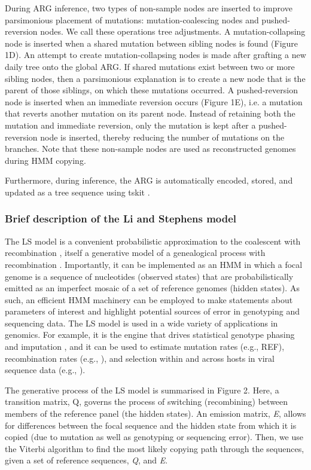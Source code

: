 \documentclass{article}
\begin{document}
During ARG inference, two types of non-sample nodes are inserted to improve
parsimonious placement of mutations: mutation-coalescing nodes and
pushed-reversion nodes. We call these operations tree adjustments. A
mutation-collapsing node is inserted when a shared mutation between sibling
nodes is found (Figure 1D). An attempt to create mutation-collapsing nodes is
made after grafting a new daily tree onto the global ARG. If shared mutations
exist between two or more sibling nodes, then a parsimonious explanation is to
create a new node that is the parent of those siblings, on which these
mutations occurred. A pushed-reversion node is inserted when an immediate
reversion occurs (Figure 1E), i.e. a mutation that reverts another mutation on
its parent node. Instead of retaining both the mutation and immediate
reversion, only the mutation is kept after a pushed-reversion node is inserted,
thereby reducing the number of mutations on the branches. Note that these
non-sample nodes are used as reconstructed genomes during HMM copying.

Furthermore, during inference, the ARG is automatically encoded, stored, and
updated as a tree sequence using tskit \cite{Kelleher2018-xc}.

\subsubsection{Brief description of the Li and Stephens model}

The LS model is a convenient probabilistic approximation to the coalescent with
recombination \cite{Hudson1983-if}, itself a generative model of a genealogical
process with recombination \cite{Li2003-ib}. Importantly, it can be implemented
as an HMM in which a focal genome is a sequence of nucleotides (observed
states) that are probabilistically emitted as an imperfect mosaic of a set of
reference genomes (hidden states). As such, an efficient HMM machinery can be
employed to make statements about parameters of interest and highlight
potential sources of error in genotyping and sequencing data. The LS model is
used in a wide variety of applications in genomics. For example, it is the
engine that drives statistical genotype phasing and imputation
\cite{Delaneau2019-wl,Browning2021-cg,Browning2018-nk,Rubinacci2020-pa}, and it
can be used to estimate mutation rates (e.g., REF), recombination rates (e.g.,
\cite{Hinch2011-tz}), and selection within and across hosts in viral sequence
data (e.g., \cite{Palmer2019-wa}).

The generative process of the LS model is summarised in Figure 2. Here, a
transition matrix, Q, governs the process of switching (recombining) between
members of the reference panel (the hidden states). An emission matrix,
\textit{E}, allows for differences between the focal sequence and the hidden
state from which it is copied (due to mutation as well as genotyping or
sequencing error). Then, we use the Viterbi algorithm \cite{Viterbi1967-ol} to
find the most likely copying path through the sequences, given a set of
reference sequences, \textit{Q}, and \textit{E}.
\end{document}
